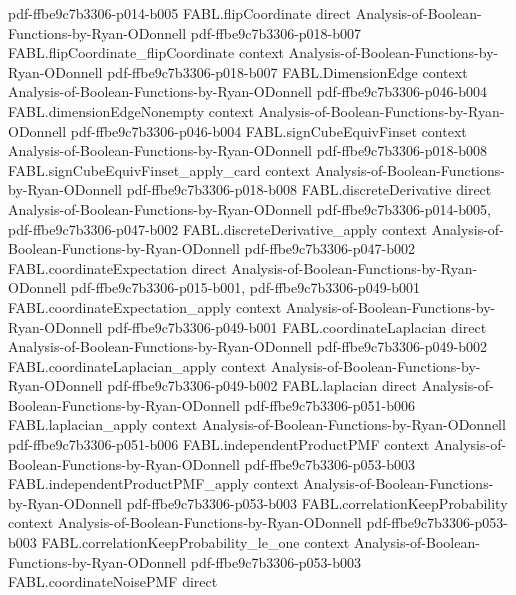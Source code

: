 \begin{theorem}
  {pdf-ffbe9c7b3306-p014-b005}
\proofstep
  {FABL.flipCoordinate}
  {direct}
  {Analysis-of-Boolean-Functions-by-Ryan-ODonnell}
  {pdf-ffbe9c7b3306-p018-b007}
\proofstep
  {FABL.flipCoordinate_flipCoordinate}
  {context}
  {Analysis-of-Boolean-Functions-by-Ryan-ODonnell}
  {pdf-ffbe9c7b3306-p018-b007}
\proofstep
  {FABL.DimensionEdge}
  {context}
  {Analysis-of-Boolean-Functions-by-Ryan-ODonnell}
  {pdf-ffbe9c7b3306-p046-b004}
\proofstep
  {FABL.dimensionEdgeNonempty}
  {context}
  {Analysis-of-Boolean-Functions-by-Ryan-ODonnell}
  {pdf-ffbe9c7b3306-p046-b004}
\proofstep
  {FABL.signCubeEquivFinset}
  {context}
  {Analysis-of-Boolean-Functions-by-Ryan-ODonnell}
  {pdf-ffbe9c7b3306-p018-b008}
\proofstep
  {FABL.signCubeEquivFinset_apply_card}
  {context}
  {Analysis-of-Boolean-Functions-by-Ryan-ODonnell}
  {pdf-ffbe9c7b3306-p018-b008}
\proofstep
  {FABL.discreteDerivative}
  {direct}
  {Analysis-of-Boolean-Functions-by-Ryan-ODonnell}
  {pdf-ffbe9c7b3306-p014-b005,
    pdf-ffbe9c7b3306-p047-b002}
\proofstep
  {FABL.discreteDerivative_apply}
  {context}
  {Analysis-of-Boolean-Functions-by-Ryan-ODonnell}
  {pdf-ffbe9c7b3306-p047-b002}
\proofstep
  {FABL.coordinateExpectation}
  {direct}
  {Analysis-of-Boolean-Functions-by-Ryan-ODonnell}
  {pdf-ffbe9c7b3306-p015-b001,
    pdf-ffbe9c7b3306-p049-b001}
\proofstep
  {FABL.coordinateExpectation_apply}
  {context}
  {Analysis-of-Boolean-Functions-by-Ryan-ODonnell}
  {pdf-ffbe9c7b3306-p049-b001}
\proofstep
  {FABL.coordinateLaplacian}
  {direct}
  {Analysis-of-Boolean-Functions-by-Ryan-ODonnell}
  {pdf-ffbe9c7b3306-p049-b002}
\proofstep
  {FABL.coordinateLaplacian_apply}
  {context}
  {Analysis-of-Boolean-Functions-by-Ryan-ODonnell}
  {pdf-ffbe9c7b3306-p049-b002}
\proofstep
  {FABL.laplacian}
  {direct}
  {Analysis-of-Boolean-Functions-by-Ryan-ODonnell}
  {pdf-ffbe9c7b3306-p051-b006}
\proofstep
  {FABL.laplacian_apply}
  {context}
  {Analysis-of-Boolean-Functions-by-Ryan-ODonnell}
  {pdf-ffbe9c7b3306-p051-b006}
\proofstep
  {FABL.independentProductPMF}
  {context}
  {Analysis-of-Boolean-Functions-by-Ryan-ODonnell}
  {pdf-ffbe9c7b3306-p053-b003}
\proofstep
  {FABL.independentProductPMF_apply}
  {context}
  {Analysis-of-Boolean-Functions-by-Ryan-ODonnell}
  {pdf-ffbe9c7b3306-p053-b003}
\proofstep
  {FABL.correlationKeepProbability}
  {context}
  {Analysis-of-Boolean-Functions-by-Ryan-ODonnell}
  {pdf-ffbe9c7b3306-p053-b003}
\proofstep
  {FABL.correlationKeepProbability_le_one}
  {context}
  {Analysis-of-Boolean-Functions-by-Ryan-ODonnell}
  {pdf-ffbe9c7b3306-p053-b003}
\proofstep
  {FABL.coordinateNoisePMF}
  {direct}

\end{theorem}
